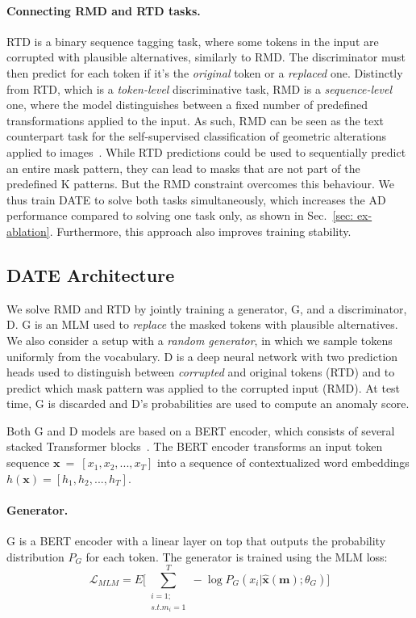 \documentclass[11pt]{article}
\newcommand{\bx}{\bm{x}}
\begin{document}
\paragraph{Connecting RMD and RTD tasks.} RTD is a binary sequence tagging task, where some tokens in the input are corrupted with plausible alternatives, similarly to RMD. The discriminator must then predict for each token if it's the \emph{original} token or a \emph{replaced} one. Distinctly from RTD, which is a \emph{token-level} discriminative task, RMD is a \emph{sequence-level} one, where the model distinguishes between a fixed number of predefined transformations applied to the input. As such, RMD can be seen as the text counterpart task for the self-supervised classification of geometric alterations applied to images~\cite{Golan2018,neurips2019}. While RTD predictions could be used to sequentially predict an entire mask pattern, they can lead to masks that are not part of the predefined K patterns. But the RMD constraint overcomes this behaviour. We thus train DATE to solve both tasks simultaneously, which increases the AD performance compared to solving one task only, as shown in Sec.~\ref{sec: ex-ablation}. Furthermore, this approach also improves training stability.

\subsection{DATE Architecture}
We solve RMD and RTD by jointly training a generator, G, and a discriminator, D. G is an MLM used to \emph{replace} the masked tokens with plausible alternatives. We also consider a setup with a \emph{random generator}, in which we sample tokens uniformly from the vocabulary. D is a deep neural network with two prediction heads used to distinguish between \emph{corrupted} and original tokens (RTD) and to predict which mask pattern was applied to the corrupted input (RMD). At test time, G is discarded and D's probabilities are used to compute an anomaly score.

Both G and D models are based on a BERT encoder, which consists of several stacked Transformer blocks~\cite{Vaswani2017}. The BERT encoder transforms an input token sequence $\bx~=~[x_1, x_2, ..., x_T]$ into a sequence of contextualized word embeddings $h(\bx) = [h_1, h_2, ..., h_T]$.

\paragraph{Generator.} G is a BERT encoder with a linear layer on top that outputs the probability distribution $P_G$ for each token. The generator is trained using the MLM loss:
\begin{equation}
    \mathcal{L}_{MLM}= E\biggl[\sum_{\substack{i=1;\\s.t. m_i=1}}^{T} -\log P_G(x_i|\bm{\hat{x}}(\bm{m});\theta_G)\biggr]
\end{equation}
\end{document}
